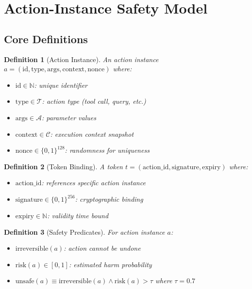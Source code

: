 \documentclass[12pt]{article}
\newtheorem{definition}{Definition}[section]
\begin{document}
\section{Action-Instance Safety Model}

\subsection{Core Definitions}

\begin{definition}[Action Instance]
An action instance $a = (\text{id}, \text{type}, \text{args}, \text{context}, \text{nonce})$ where:
\begin{itemize}
    \item $\text{id} \in \mathbb{N}$: unique identifier
    \item $\text{type} \in \mathcal{T}$: action type (tool call, query, etc.)
    \item $\text{args} \in \mathcal{A}$: parameter values
    \item $\text{context} \in \mathcal{C}$: execution context snapshot
    \item $\text{nonce} \in \{0,1\}^{128}$: randomness for uniqueness
\end{itemize}
\end{definition}

\begin{definition}[Token Binding]
A token $t = (\text{action\_id}, \text{signature}, \text{expiry})$ where:
\begin{itemize}
    \item $\text{action\_id}$: references specific action instance
    \item $\text{signature} \in \{0,1\}^{256}$: cryptographic binding
    \item $\text{expiry} \in \mathbb{N}$: validity time bound
\end{itemize}
\end{definition}

\begin{definition}[Safety Predicates]
For action instance $a$:
\begin{itemize}
    \item $\text{irreversible}(a)$: action cannot be undone
    \item $\text{risk}(a) \in [0,1]$: estimated harm probability
    \item $\text{unsafe}(a) \equiv \text{irreversible}(a) \land \text{risk}(a) > \tau$ where $\tau=0.7$
\end{itemize}
\end{definition}
\end{document}
